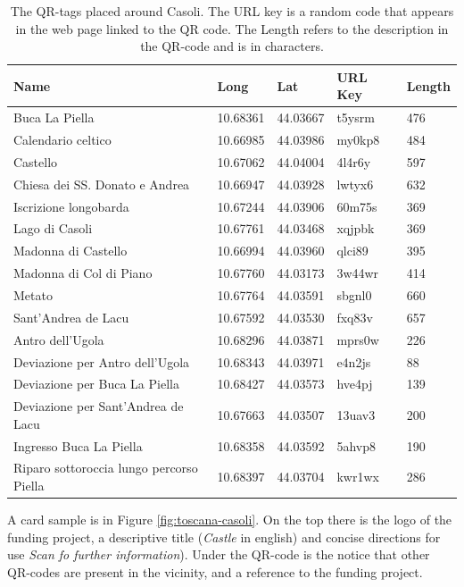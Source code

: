 \documentclass[sustainability,article,submit,pdftex,moreauthors]{Definitions/mdpi}
\begin{document}
\begin{table}
	\begin{tabular}{|>{\raggedright\arraybackslash}p{3cm}|l|l|l|l|}
\hline 
\textbf{Name} & \textbf{Long} & \textbf{Lat} & \textbf{URL Key} & \textbf{Length} \\
\hline
Buca La Piella & 10.68361 & 44.03667 & t5ysrm & 476 \\
\hline
Calendario celtico & 10.66985 & 44.03986 & my0kp8 & 484 \\
\hline
Castello & 10.67062 & 44.04004 & 4l4r6y & 597 \\
\hline
Chiesa dei SS. Donato e Andrea & 10.66947 & 44.03928 & lwtyx6 & 632 \\
\hline
Iscrizione longobarda & 10.67244 & 44.03906 & 60m75s & 369 \\
\hline
Lago di Casoli & 10.67761 & 44.03468 & xqjpbk & 369 \\
\hline
Madonna di Castello & 10.66994 & 44.03960 & qlci89 & 395 \\
\hline
Madonna di Col di Piano & 10.67760 & 44.03173 & 3w44wr & 414 \\
\hline
Metato & 10.67764 & 44.03591 & sbgnl0 & 660 \\
\hline
Sant'Andrea de Lacu & 10.67592 & 44.03530 & fxq83v & 657 \\
\hline
Antro dell’Ugola & 10.68296 & 44.03871 & mprs0w & 226 \\
\hline
Deviazione per Antro dell’Ugola & 10.68343 & 44.03971 & e4n2js & 88 \\
\hline
Deviazione per Buca La Piella & 10.68427 & 44.03573 & hve4pj & 139 \\
\hline
Deviazione per Sant’Andrea de Lacu & 10.67663 & 44.03507 & 13uav3 & 200 \\
\hline
Ingresso Buca La Piella & 10.68358 & 44.03592 & 5ahvp8 & 190 \\
\hline
Riparo sottoroccia lungo percorso Piella & 10.68397 & 44.03704 & kwr1wx & 286 \\
\hline
	\end{tabular}
\caption{The QR-tags placed around Casoli. The URL key is a random code that appears in the web page linked to the QR code. The Length refers to the description in the QR-code and is in characters. \label{tab:qrtags}}
\end{table}

A card sample is in Figure \ref{fig:toscana-casoli}. On the top there is the logo of the funding project, a descriptive title ({\em Castle} in english) and concise directions for use {\em Scan fo further information}). Under the QR-code is the notice that other QR-codes are present in the vicinity, and a reference to the funding project.
\end{document}
